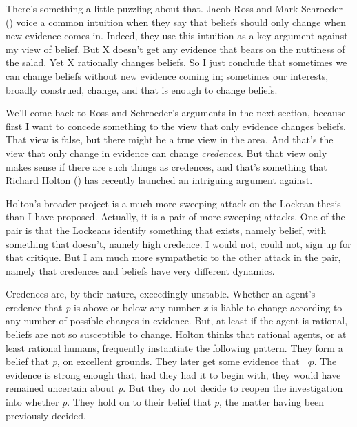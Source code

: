 \documentclass[
  11pt,
  letterpaper,
  DIV=11,
  numbers=noendperiod,
  twoside]{scrartcl}
\begin{document}
There's something a little puzzling about that. Jacob Ross and Mark
Schroeder () voice a common
intuition when they say that beliefs should only change when new
evidence comes in. Indeed, they use this intuition as a key argument
against my view of belief. But X doesn't get any evidence that bears on
the nuttiness of the salad. Yet X rationally changes beliefs. So I just
conclude that sometimes we can change beliefs without new evidence
coming in; sometimes our interests, broadly construed, change, and that
is enough to change beliefs.

We'll come back to Ross and Schroeder's arguments in the next section,
because first I want to concede something to the view that only evidence
changes beliefs. That view is false, but there might be a true view in
the area. And that's the view that only change in evidence can change
\emph{credences}. But that view only makes sense if there are such
things as credences, and that's something that Richard Holton
() has recently launched an intriguing
argument against.

Holton's broader project is a much more sweeping attack on the Lockean
thesis than I have proposed. Actually, it is a pair of more sweeping
attacks. One of the pair is that the Lockeans identify something that
exists, namely belief, with something that doesn't, namely high
credence. I would not, could not, sign up for that critique. But I am
much more sympathetic to the other attack in the pair, namely that
credences and beliefs have very different dynamics.

Credences are, by their nature, exceedingly unstable. Whether an agent's
credence that \emph{p} is above or below any number \emph{x} is liable
to change according to any number of possible changes in evidence. But,
at least if the agent is rational, beliefs are not so susceptible to
change. Holton thinks that rational agents, or at least rational humans,
frequently instantiate the following pattern. They form a belief that
\emph{p}, on excellent grounds. They later get some evidence that
\(\neg p\). The evidence is strong enough that, had they had it to begin
with, they would have remained uncertain about \emph{p}. But they do not
decide to reopen the investigation into whether \emph{p}. They hold on
to their belief that \emph{p}, the matter having been previously
decided.
\end{document}
